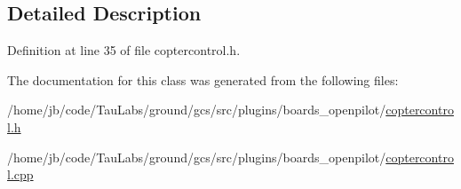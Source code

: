 \subsection{\-Detailed \-Description}


\-Definition at line 35 of file coptercontrol.\-h.



\-The documentation for this class was generated from the following files\-:\begin{DoxyCompactItemize}
\item 
/home/jb/code/\-Tau\-Labs/ground/gcs/src/plugins/boards\-\_\-openpilot/\hyperlink{coptercontrol_8h}{coptercontrol.\-h}\item 
/home/jb/code/\-Tau\-Labs/ground/gcs/src/plugins/boards\-\_\-openpilot/\hyperlink{coptercontrol_8cpp}{coptercontrol.\-cpp}\end{DoxyCompactItemize}
